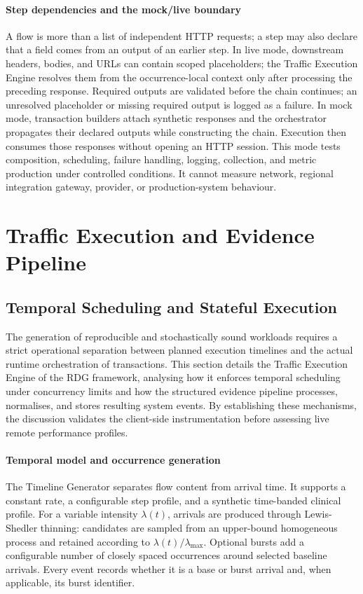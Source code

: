 \paragraph{Step dependencies and the mock/live boundary}
\noindent A flow is more than a list of independent HTTP requests; a step may also declare that a field comes from an output of an earlier
step. In live mode, downstream headers, bodies, and URLs can contain scoped
placeholders; the Traffic Execution Engine resolves them from the occurrence-local
context only after processing the preceding response. Required outputs are
validated before the chain continues; an unresolved placeholder or missing required output is logged as a failure. In mock mode, transaction builders attach synthetic responses and the
orchestrator propagates their declared outputs while constructing the chain.
Execution then consumes those responses without opening an HTTP session. This
mode tests composition, scheduling, failure handling, logging, collection, and
metric production under controlled conditions. It cannot measure network,
regional integration gateway, provider, or production-system behaviour.

\section{Traffic Execution and Evidence Pipeline}
\label{sec:rdg-execution-observability}

\subsection{Temporal Scheduling and Stateful Execution}
\label{subsec:rdg-scheduling-execution}
\noindent The generation of reproducible and stochastically sound workloads requires a
strict operational separation between planned execution timelines and the
actual runtime orchestration of transactions. This section details the
Traffic Execution Engine of the RDG framework, analysing how it enforces
temporal scheduling under concurrency limits and how the structured evidence
pipeline processes, normalises, and stores resulting system events. By
establishing these mechanisms, the discussion validates the client-side
instrumentation before assessing live remote performance profiles.

\paragraph{Temporal model and occurrence generation}
\noindent The Timeline Generator separates flow content from arrival time. It supports a
constant rate, a configurable step profile, and a synthetic time-banded
clinical profile. For a variable intensity $\lambda(t)$, arrivals are produced
through Lewis-Shedler thinning: candidates are sampled from an upper-bound
homogeneous process and retained according to
$\lambda(t)/\lambda_{\max}$. Optional bursts add a configurable number of
closely spaced occurrences around selected baseline arrivals. Every event
records whether it is a base or burst arrival and, when applicable, its burst
identifier.

